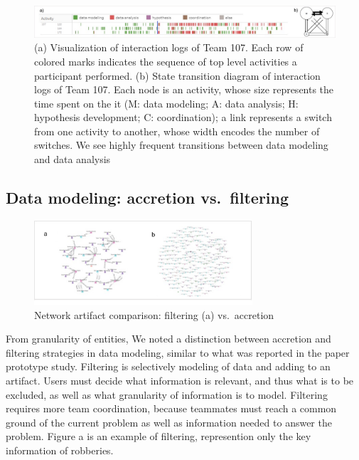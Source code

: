 \begin{figure}
\centering
\includegraphics[width=6.5in]{./img/intertwined.jpg}
\caption{(a) Visualization of interaction logs of Team 107. Each row of
colored marks indicates the sequence of top level activities a
participant performed. (b) State transition diagram of interaction logs of Team 107. Each node is an activity, whose size represents the time spent on the it (M: data modeling; A: data analysis; H: hypothesis development; C: coordination); a
link represents a switch from one activity to another, whose width
encodes the number of switches. We see highly frequent transitions between data modeling and data analysis \label{fig:intertwined}}
\end{figure}


\subsection{Data modeling: accretion
vs.~filtering}\label{data-modeling-accretion-vs.filtering}

\begin{figure}
\centering
\includegraphics[width=3.20000in]{./img/network_accretion_filter.png}
\caption{Network artifact comparison: filtering (a)
vs.~accretion\label{fig:network_accretion}}
\end{figure}

From granularity of entities, We noted a distinction between accretion
and filtering strategies in data modeling, similar to what was reported in the paper prototype study. Filtering is selectively modeling of data
and adding to an artifact. Users must decide what information is
relevant, and thus what is to be excluded, as well as what granularity
of information is to model. Filtering requires more team coordination,
because teammates must reach a common ground of the current problem as
well as information needed to answer the problem. Figure
\autocite{fig:network_accretion}a is an example of filtering,
represention only the key information of robberies.

